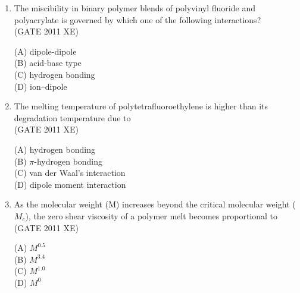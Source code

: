 \documentclass[journal,12pt,onecolumn]{IEEEtran}
\begin{document}
\begin{enumerate}
\begin{enumerate}
\begin{enumerate}[label=\arabic*)]
\hfill{(GATE 2011 XE)} \\
\begin{multicols}{2}
(A) translational motion of entire molecule\\
(B) long cooperative wriggling motion of 40 to 50 C–C bonds\\
(C) short cooperative motion of 5 to 6 bonds of the molecules\\
(D) vibration of carbon atoms of the polymer molecules
\end{multicols}

\newpage 

\item The miscibility in binary polymer blends of polyvinyl fluoride and polyacrylate is governed by which one of the following interactions?\\

\hfill{(GATE 2011 XE)} \\
\begin{multicols}{4}
(A) dipole-dipole\\
(B) acid-base type\\
(C) hydrogen bonding\\
(D) ion–dipole
\end{multicols}



\item The melting temperature of polytetrafluoroethylene is higher than its degradation temperature due to\\

\hfill{(GATE 2011 XE)} \\
\begin{multicols}{4}
(A) hydrogen bonding\\
(B) $\pi$-hydrogen bonding\\
(C) van der Waal’s interaction\\
(D) dipole moment interaction
\end{multicols}

\item As the molecular weight (M) increases beyond the critical molecular weight ($M_c$), the zero shear viscosity of a polymer melt becomes proportional to\\

\hfill{(GATE 2011 XE)} \\
\begin{multicols}{4}
(A) $M^{0.5}$\\
(B) $M^{3.4}$\\
(C) $M^{1.0}$\\
(D) $M^0$
\end{multicols}


\end{enumerate}
\end{enumerate}
\end{enumerate}
\end{document}
